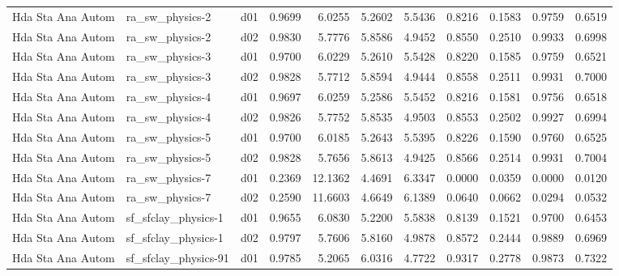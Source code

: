 \begin{longtable}{lllrrrrrrrr}
    Hda Sta Ana Autom  &       ra\_sw\_physics-2 &     d01 &   0.9699 &   6.0255 &   5.2602 &       5.5436 &        0.8216 &       0.1583 &           0.9759 &  0.6519 \\
    Hda Sta Ana Autom  &       ra\_sw\_physics-2 &     d02 &   0.9830 &   5.7776 &   5.8586 &       4.9452 &        0.8550 &       0.2510 &           0.9933 &  0.6998 \\
    Hda Sta Ana Autom  &       ra\_sw\_physics-3 &     d01 &   0.9700 &   6.0229 &   5.2610 &       5.5428 &        0.8220 &       0.1585 &           0.9759 &  0.6521 \\
    Hda Sta Ana Autom  &       ra\_sw\_physics-3 &     d02 &   0.9828 &   5.7712 &   5.8594 &       4.9444 &        0.8558 &       0.2511 &           0.9931 &  0.7000 \\
    Hda Sta Ana Autom  &       ra\_sw\_physics-4 &     d01 &   0.9697 &   6.0259 &   5.2586 &       5.5452 &        0.8216 &       0.1581 &           0.9756 &  0.6518 \\
    Hda Sta Ana Autom  &       ra\_sw\_physics-4 &     d02 &   0.9826 &   5.7752 &   5.8535 &       4.9503 &        0.8553 &       0.2502 &           0.9927 &  0.6994 \\
    Hda Sta Ana Autom  &       ra\_sw\_physics-5 &     d01 &   0.9700 &   6.0185 &   5.2643 &       5.5395 &        0.8226 &       0.1590 &           0.9760 &  0.6525 \\
    Hda Sta Ana Autom  &       ra\_sw\_physics-5 &     d02 &   0.9828 &   5.7656 &   5.8613 &       4.9425 &        0.8566 &       0.2514 &           0.9931 &  0.7004 \\
    Hda Sta Ana Autom  &       ra\_sw\_physics-7 &     d01 &   0.2369 &  12.1362 &   4.4691 &       6.3347 &        0.0000 &       0.0359 &           0.0000 &  0.0120 \\
    Hda Sta Ana Autom  &       ra\_sw\_physics-7 &     d02 &   0.2590 &  11.6603 &   4.6649 &       6.1389 &        0.0640 &       0.0662 &           0.0294 &  0.0532 \\
    Hda Sta Ana Autom  &   sf\_sfclay\_physics-1 &     d01 &   0.9655 &   6.0830 &   5.2200 &       5.5838 &        0.8139 &       0.1521 &           0.9700 &  0.6453 \\
    Hda Sta Ana Autom  &   sf\_sfclay\_physics-1 &     d02 &   0.9797 &   5.7606 &   5.8160 &       4.9878 &        0.8572 &       0.2444 &           0.9889 &  0.6969 \\
    Hda Sta Ana Autom  &  sf\_sfclay\_physics-91 &     d01 &   0.9785 &   5.2065 &   6.0316 &       4.7722 &        0.9317 &       0.2778 &           0.9873 &  0.7322 \\

\end{longtable}
